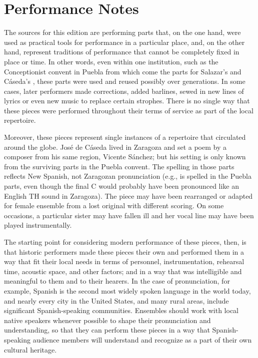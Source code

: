 \section*{Performance Notes}

The sources for this edition are performing parts that, on the one hand,
were used as practical tools for performance in a particular place, and, on the
other hand, represent traditions of performance that cannot be completely fixed
in place or time.
In other words, even within one institution, such as the Conceptionist convent
in Puebla from which come the parts for Salazar's 
and Cáseda's , these parts were used and reused
possibly over generations. 
In some cases, later performers made corrections, added barlines, sewed in new
lines of lyrics or even new music to replace certain strophes.
There is no single way that these pieces were performed throughout their terms
of service as part of the local repertoire.

Moreover, these pieces represent single instances of a repertoire that
circulated around the globe. 
José de Cáseda lived in Zaragoza and set a poem by a composer from his same
region, Vicente Sánchez; but his setting is only known from the surviving parts
in the Puebla convent.
The spelling in those parts reflects New Spanish, not Zaragozan pronunciation
(e.g.,  is spelled  in the
Puebla parts, even though the final C would probably have been pronounced like an
English TH sound in Zaragoza).
The piece may have been rearranged or adapted for female ensemble from a lost
original with different scoring.
On some occasions, a particular sister may have fallen ill and her vocal line
may have been played instrumentally.

The starting point for considering modern performance of these pieces, then, is
that historic performers made these pieces their own and performed them in a way
that fit their local needs in terms of personnel, instrumentation, rehearsal
time, acoustic space, and other factors; and in a way that was intelligible and
meaningful to them and to their hearers.
In the case of pronunciation, for example, Spanish is the second most widely
spoken language in the world today, and nearly every city in the United States,
and many rural areas, include significant Spanish-speaking communities.
Ensembles should work with local native speakers whenever possible to shape
their pronunciation and understanding, so that they can perform these pieces in
a way that Spanish-speaking audience members will understand and recognize as a
part of their own cultural heritage.

